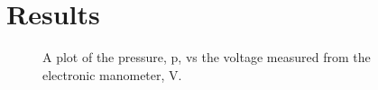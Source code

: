 \chapter{Results}
\label{cp:results}

\begin{figure}[htpb]
    \centering
    
    \caption[Plot of pressure vs voltage measured from the electronic manometer.]{A plot of the pressure, \gls{p}, vs the voltage measured from the electronic manometer, \gls{V}.}
    \label{fig:pressure_vs_voltage}
\end{figure}